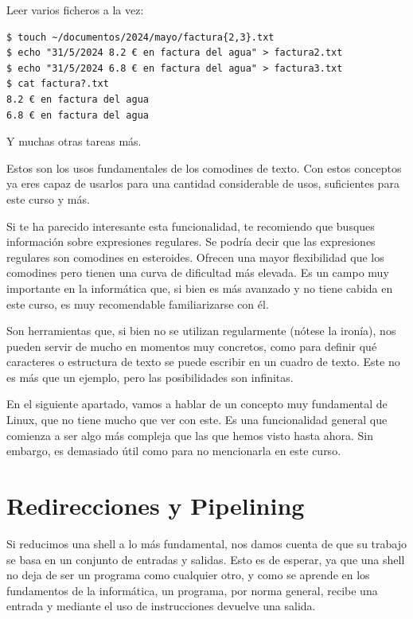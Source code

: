 Leer varios ficheros a la vez:

\begin{tcolorbox-code}
\begin{lstlisting}
$ touch ~/documentos/2024/mayo/factura{2,3}.txt
$ echo "31/5/2024 8.2 € en factura del agua" > factura2.txt
$ echo "31/5/2024 6.8 € en factura del agua" > factura3.txt
$ cat factura?.txt
8.2 € en factura del agua
6.8 € en factura del agua
\end{lstlisting}
\end{tcolorbox-code}

Y muchas otras tareas más.

Estos son los usos fundamentales de los comodines de texto. Con estos conceptos ya eres capaz de usarlos para una cantidad considerable de usos, suficientes para este curso y más.

Si te ha parecido interesante esta funcionalidad, te recomiendo que busques información sobre expresiones regulares. Se podría decir que las expresiones regulares son comodines en esteroides. Ofrecen una mayor flexibilidad que los comodines pero tienen una curva de dificultad más elevada. Es un campo muy importante en la informática que, si bien es más avanzado y no tiene cabida en este curso, es muy recomendable familiarizarse con él. 

Son herramientas que, si bien no se utilizan regularmente (nótese la ironía), nos pueden servir de mucho en momentos muy concretos, como para definir qué caracteres o estructura de texto se puede escribir en un cuadro de texto. Este no es más que un ejemplo, pero las posibilidades son infinitas.

En el siguiente apartado, vamos a hablar de un concepto muy fundamental de Linux, que no tiene mucho que ver con este. Es una funcionalidad general que comienza a ser algo más compleja que las que hemos visto hasta ahora. Sin embargo, es demasiado útil como para no mencionarla en este curso.

\section{Redirecciones y Pipelining}

Si reducimos una shell a lo más fundamental, nos damos cuenta de que su trabajo se basa en un conjunto de entradas y salidas. Esto es de esperar, ya que una shell no deja de ser un programa como cualquier otro, y como se aprende en los fundamentos de la informática, un programa, por norma general, recibe una entrada y mediante el uso de instrucciones devuelve una salida.

